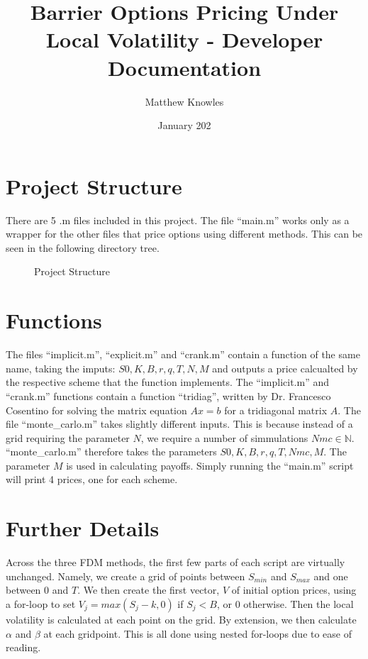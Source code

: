 \documentclass[11pt]{article}
\title{Barrier Options Pricing Under Local Volatility - Developer Documentation}
\author{Matthew Knowles}
\date{January 202}
\begin{document}
\maketitle

\section{Project Structure}

There are 5 .m files included in this project. The file ``main.m'' works only as a wrapper for the other files that price options using different methods. 
This can be seen in the following directory tree. 

\begin{figure}[h]
    \caption{Project Structure}
\end{figure}

\section{Functions}

The files ``implicit.m'', ``explicit.m'' and ``crank.m'' contain a function of the same name, taking the imputs: $S0, K, B, r, q, T, N, M$ and outputs a price 
calcualted by the respective scheme that the function implements. The ``implicit.m'' and ``crank.m'' functions contain a function ``tridiag'', written by Dr. Francesco 
Cosentino for solving the matrix equation $Ax=b$ for a tridiagonal matrix $A$. The file ``monte\_carlo.m'' takes slightly different inputs. This is because 
instead of a grid requiring the parameter $N$, we require a number of simmulations $Nmc \in \mathbb{N}$. ``monte\_carlo.m'' therefore takes the parameters
$S0, K, B, r, q, T, Nmc, M$. The parameter $M$ is used in calculating payoffs. Simply running the ``main.m'' script will print 4 prices, one for each scheme.

\section{Further Details}
Across the three FDM methods, the first few parts of each script are virtually unchanged. Namely, we create a grid of points between $S_{min}$ and $S_{max}$
and one between $0$ and $T$. We then create the first vector, $V$ of initial option prices, using a for-loop to set $V_j= max(S_j-k,0)$ if $S_j < B$, or 0 otherwise. 
Then the local volatility is calculated at each point on the grid. By extension, we then calculate $\alpha$ and $\beta$ at each gridpoint. This is all done 
using nested for-loops due to ease of reading. \\
\end{document}
